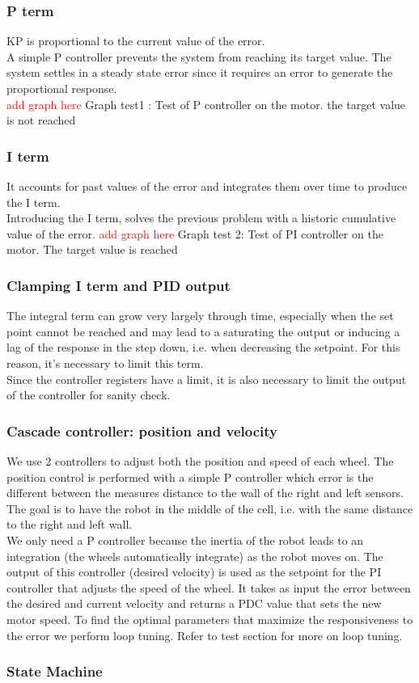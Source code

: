 \subsubsection*{P term}

KP is proportional to the current value of the error. \\
A simple P controller prevents the system from reaching its target value. The system settles in a steady state error since it requires an error to generate the proportional response.\\
\vskip 0.1in
\noindent
\textcolor{red}{add graph here}
Graph test1 : Test of P controller on the motor. the target value is not reached
\subsubsection*{I term}

It accounts for past values of the error and integrates them over time to produce the I term. \\
Introducing the I term, solves the previous problem with a historic cumulative value of the error.
\vskip 0.1in
\noindent
\textcolor{red}{add graph here}
Graph test 2: Test of PI controller on the motor. The target value is reached

\subsubsection*{Clamping I term and PID output}

The integral term can grow very largely through time, especially when the set point cannot be reached and may lead to a saturating the output or inducing a lag of the response in the step down, i.e. when decreasing the setpoint. For this reason, it’s necessary to limit this term.\\
Since the controller registers have a limit, it is also necessary to limit the output of the controller for sanity check.

\subsubsection*{Cascade controller: position and velocity}

We use 2 controllers to adjust both the position and speed of each wheel.
\vskip 0.1in
\noindent
The position control is performed with a simple P controller which error is the different between the measures distance to the wall of the right and left sensors. The goal is to have the robot in the middle of the cell, i.e. with the same distance to the right and left wall.\\
We only need a P controller because the inertia of the robot leads to an integration (the wheels automatically integrate) as the robot moves on.
\vskip 0.1in
\noindent
The output of this controller (desired velocity) is used as the setpoint for the PI controller that adjusts the speed of the wheel. It takes as input the error between the desired and current velocity and returns a PDC value that sets the new motor speed.
\vskip 0.1in
\noindent
To find the optimal parameters that maximize the responsiveness to the error we perform loop tuning. Refer to test section for more on loop tuning.

\subsubsection{State Machine}
